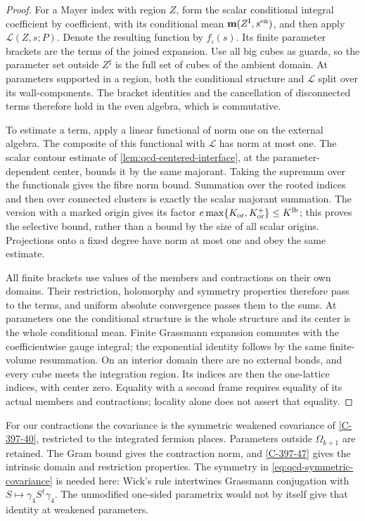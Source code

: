 \documentclass[11pt,letterpaper,reqno]{amsart}
\theoremstyle{definition}
\theoremstyle{remark}
\begin{document}
\begin{proof}
For a Mayer index with region $Z$, form the scalar conditional
integral coefficient by coefficient, with its conditional mean
$\mathbf m(Z^{\rm I},s^{\rm en})$, and then apply
$\mathscr L(Z,s;P)$. Denote the resulting function by $f_\iota(s)$.
Its finite parameter brackets are the terms of the joined
expansion. Use all big cubes as guards, so the parameter set
outside $Z^\sharp$ is the full set of cubes of the ambient
domain. At parameters supported in a region, both the
conditional structure and $\mathscr L$ split over its
wall-components. The bracket identities and the cancellation
of disconnected terms therefore hold in the even algebra,
which is commutative.

To estimate a term, apply a linear functional of norm one
on the external algebra. The composite of this functional
with $\mathscr L$ has norm at most one. The scalar contour
estimate of \cref{lem:qcd-centered-interface}, at the
parameter-dependent center, bounds it by the same majorant.
Taking the supremum over the functionals gives the fibre
norm bound. Summation over the rooted indices and then over
connected clusters is exactly the scalar majorant summation.
The version with a marked origin gives its factor
$e\max\{K_{\rm or},K_{\rm or}^+\}\le K^{\rm lb}$; this proves
the selective bound, rather than a bound by the size of
all scalar origins. Projections onto a fixed degree have
norm at most one and obey the same estimate.

All finite brackets use values of the members and
contractions on their own domains. Their restriction,
holomorphy and symmetry properties therefore pass to the
terms, and uniform absolute convergence passes them to
the sums. At parameters one the conditional structure is
the whole structure and its center is the whole conditional
mean. Finite Grassmann expansion commutes with the
coefficientwise gauge integral; the exponential identity
follows by the same finite-volume resummation. On an
interior domain there are no external bonds, and every
cube meets the integration region. Its indices are then
the one-lattice indices, with center zero. Equality with
a second frame requires equality of its actual members
and contractions; locality alone does not assert that equality.
\end{proof}

For our contractions the covariance is the symmetric weakened
covariance of \cref{C-397-40}, restricted to the integrated
fermion places. Parameters outside $\Omega_{k+1}$ are retained.
The Gram bound gives the contraction norm, and
\cref{C-397-47} gives the intrinsic domain and restriction
properties. The symmetry in \eqref{eq:qcd-symmetric-covariance}
is needed here: Wick's rule intertwines Grassmann conjugation
with $S\mapsto\gamma_4S^\dagger\gamma_4$. The unmodified
one-sided parametrix would not by itself give that identity
at weakened parameters.
\end{document}
